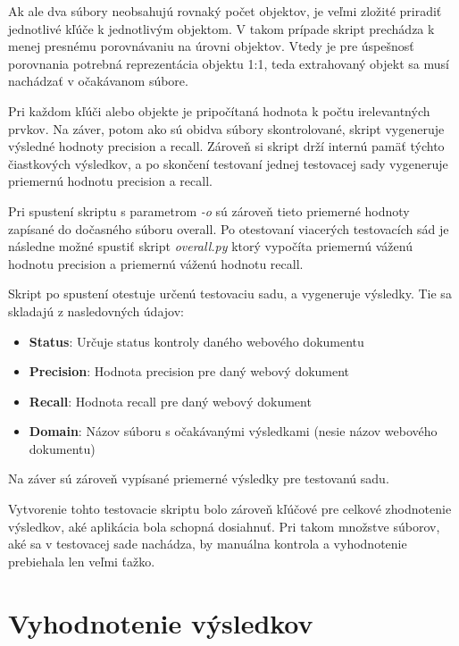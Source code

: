 Ak ale dva súbory neobsahujú rovnaký počet objektov, je veľmi zložité priradiť jednotlivé kľúče k jednotlivým objektom. V takom prípade skript prechádza k menej presnému porovnávaniu na úrovni objektov. Vtedy je pre úspešnosť porovnania potrebná reprezentácia objektu 1:1, teda extrahovaný objekt sa musí nachádzať v očakávanom súbore.

Pri každom kľúči alebo objekte je pripočítaná hodnota k počtu irelevantných prvkov. Na záver, potom ako sú obidva súbory skontrolované, skript vygeneruje výsledné hodnoty precision a recall. Zároveň si skript drží internú pamäť týchto čiastkových výsledkov, a po skončení testovaní jednej testovacej sady vygeneruje priemernú hodnotu precision a recall.

Pri spustení skriptu s parametrom \textit{-o} sú zároveň tieto priemerné hodnoty zapísané do dočasného súboru overall. Po otestovaní viacerých testovacích sád je následne možné spustiť skript \textit{overall.py} ktorý vypočíta priemernú váženú hodnotu precision a priemernú váženú hodnotu recall.

\bigskip

Skript po spustení otestuje určenú testovaciu sadu, a vygeneruje výsledky. Tie sa skladajú z nasledovných údajov:

\begin{itemize}
    \item \textbf{Status}: Určuje status kontroly daného webového dokumentu
    \item \textbf{Precision}: Hodnota precision pre daný webový dokument
    \item \textbf{Recall}: Hodnota recall pre daný webový dokument
    \item \textbf{Domain}: Názov súboru s očakávanými výsledkami (nesie názov webového dokumentu)
\end{itemize}

\bigskip

Na záver sú zároveň vypísané priemerné výsledky pre testovanú sadu.

\bigskip

Vytvorenie tohto testovacie skriptu bolo zároveň kľúčové pre celkové zhodnotenie výsledkov, aké aplikácia bola schopná dosiahnuť. Pri takom množstve súborov, aké sa v testovacej sade nachádza, by manuálna kontrola a vyhodnotenie prebiehala len veľmi ťažko.

\newpage

\section{Vyhodnotenie výsledkov}
